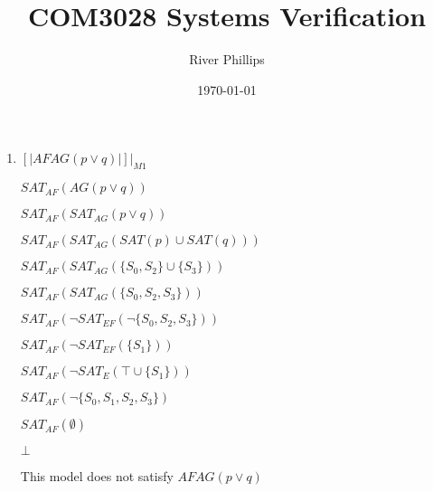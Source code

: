 \documentclass[12pt, a4paper]{article}
\title{COM3028 Systems Verification}
\author{River Phillips}
\date{\today}
\begin{document}
\maketitle

\begin{enumerate}
\item 
$[|AF AG (p \lor q)|]|_{M1}$

$SAT_{AF}(AG(p \lor q))$

$SAT_{AF}(SAT_{AG}(p \lor q))$

$SAT_{AF}(SAT_{AG}(SAT(p) \cup SAT(q)))$

$SAT_{AF}(SAT_{AG}(\{S_0, S_2\} \cup \{S_3\}))$

$SAT_{AF}(SAT_{AG}(\{S_0, S_2, S_3\}))$

$SAT_{AF}(\neg SAT_{EF}(\neg \{S_0, S_2, S_3\}))$

$SAT_{AF}(\neg SAT_{EF}( \{S_1\}))$

$SAT_{AF}(\neg SAT_{E}(\top \cup \{S_1 \} ))$

$SAT_{AF}(\neg \{S_0, S_1, S_2, S_3 \})$

$SAT_{AF}(\emptyset)$

$\bot$


This model does not satisfy $AF AG (p \lor q)$



\end{enumerate}

\printbibliography[heading=bibintoc, title={References}]
\end{document}
